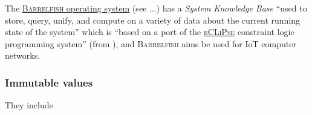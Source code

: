 The \href{http://www.barrelfish.org/}{\textsc{Barrelfish} operating
  system}  (see \cite{gerber:2018:authorization,
    giceva:2016:customized, Schupbach:2008:embracing}...) has a
  \emph{System Knowledge Base} ``used to store, query, unify, and
  compute on a variety of data about the current running state of the
  system'' which is ``based on a port of the
  \href{https://eclipseclp.org/}{\textsc{eCLiPse}} constraint logic
  programming system'' \cite{Apt:2006:constraint} (from
  \cite{barrelfish:2013:overview}), and \textsc{Barrelfish} aims be
  used for IoT computer networks.

\subsubsection{Immutable values}
\label{subsubsec:immutvalues}

They include

